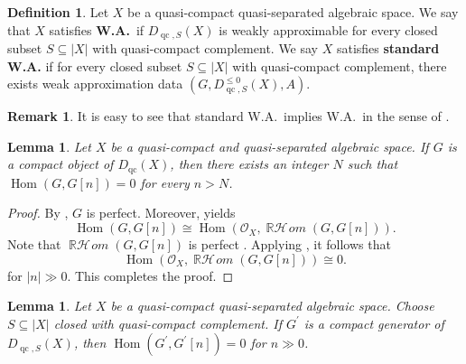 \documentclass[11pt]{amsart}
\theoremstyle{plain}
\newtheorem{lemma}[theorem]{Lemma}
\theoremstyle{definition}
\newtheorem{definition}[theorem]{Definition}
\newtheorem{remark}[theorem]{Remark}
\numberwithin{equation}{section}
\numberwithin{theorem}{section}
\begin{document}
\begin{definition}
    \label{def:wa_spaces}
    Let $X$ be a quasi-compact quasi-separated algebraic space. 
    We say that $X$ satisfies \textbf{W.A.}\ if $D_{\operatorname{qc},S}(X)$ is weakly approximable for every closed subset $S\subseteq |X|$ with quasi-compact complement.
    We say $X$ satisfies \textbf{standard W.A.} if for every closed subset $S\subseteq |X|$ with quasi-compact complement, there exists weak approximation data $(G,D^{\leq 0}_{\operatorname{qc},S}(X),A)$.
\end{definition}

\begin{remark}
    It is easy to see that standard W.A.\ implies W.A.\ in the sense of .
\end{remark}

\begin{lemma}
\label{lem:compact_ext_vanishing}
	Let $X$ be a quasi-compact and quasi-separated algebraic space.
	If $G$ is a compact object of $D_{\operatorname{qc}}(X)$, then
	there exists an integer $N$ such that $\operatorname{Hom}(G,G[n])=0$ for every $n>N$.
\end{lemma}

\begin{proof}
	By \cite[\href{https://stacks.math.columbia.edu/tag/09M8}{Tag 09M8}]{StacksProject}, $G$ is perfect. 
    Moreover, \cite[\href{https://stacks.math.columbia.edu/tag/08J7}{Tag 08J7}]{StacksProject} yields 
    \begin{displaymath}
        \operatorname{Hom}(G,G[n])
        \cong \operatorname{Hom}(\mathcal{O}_X, \operatorname{\mathbb{R}\mathcal{H}\! \mathit{om}}(G,G[n])).
    \end{displaymath}
    Note that $\operatorname{\mathbb{R}\mathcal{H}\! \mathit{om}}(G,G[n])$ is perfect \cite[\href{https://stacks.math.columbia.edu/tag/08JJ}{Tag 08JJ}]{StacksProject}.
    Applying \cite[\href{https://stacks.math.columbia.edu/tag/0GFH}{Tags 0GFH} and \href{https://stacks.math.columbia.edu/tag/0GFI}{0GFI}]{StacksProject}, it follows that 
    \begin{displaymath}
        \operatorname{Hom}(\mathcal{O}_X, \operatorname{\mathbb{R}\mathcal{H}\! \mathit{om}}(G,G[n])) \cong 0.
    \end{displaymath}
    for $|n| \gg 0$.
    This completes the proof.
\end{proof}

\begin{lemma}
    \label{lem:perf_vanishing}
    Let $X$ be a quasi-compact quasi-separated algebraic space. 
    Choose $S\subseteq |X|$ closed with quasi-compact complement.
    If $G^\prime$ is a compact generator of $D_{\operatorname{qc},S}(X)$, then $\operatorname{Hom}(G^\prime,G^\prime[n])=0$ for $n\gg 0$.
\end{lemma}
\end{document}
